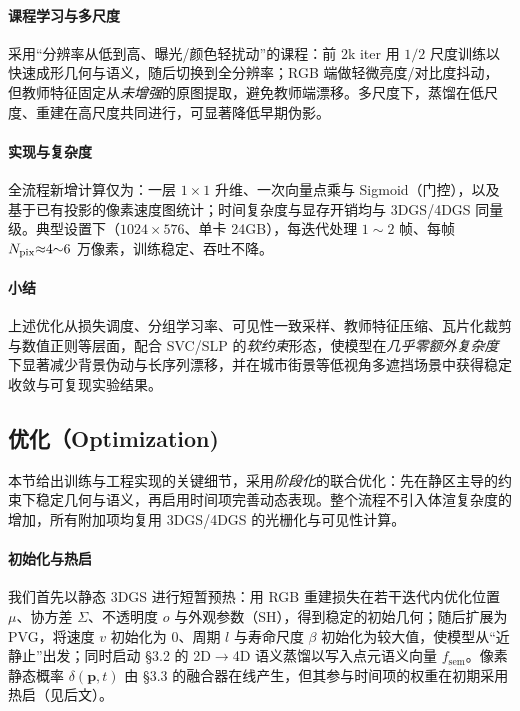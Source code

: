 \documentclass[10pt,conference]{IEEEtran} %
\begin{document}
\paragraph{课程学习与多尺度}
采用“分辨率从低到高、曝光/颜色轻扰动”的课程：前 $2$k iter 用 $1/2$ 尺度训练以快速成形几何与语义，随后切换到全分辨率；RGB 端做轻微亮度/对比度抖动，但教师特征固定从\emph{未增强}的原图提取，避免教师端漂移。多尺度下，蒸馏在低尺度、重建在高尺度共同进行，可显著降低早期伪影。

\paragraph{实现与复杂度}
全流程新增计算仅为：一层 $1{\times}1$ 升维、一次向量点乘与 Sigmoid（门控），以及基于已有投影的像素速度图统计；时间复杂度与显存开销均与 3DGS/4DGS 同量级。典型设置下（$1024{\times}576$、单卡 24GB），每迭代处理 $1{\sim}2$ 帧、每帧 $N_{\rm pix}{\approx}4{\sim}6$ 万像素，训练稳定、吞吐不降。

\paragraph{小结}
上述优化从损失调度、分组学习率、可见性一致采样、教师特征压缩、瓦片化裁剪与数值正则等层面，配合 SVC/SLP 的\emph{软约束}形态，使模型在\emph{几乎零额外复杂度}下显著减少背景伪动与长序列漂移，并在城市街景等低视角多遮挡场景中获得稳定收敛与可复现实验结果。

\subsection{优化（Optimization)}
本节给出训练与工程实现的关键细节，采用\emph{阶段化}的联合优化：先在静区主导的约束下稳定几何与语义，再启用时间项完善动态表现。整个流程不引入体渲复杂度的增加，所有附加项均复用 3DGS/4DGS 的光栅化与可见性计算。

\paragraph{初始化与热启}
我们首先以静态 3DGS 进行短暂预热：用 RGB 重建损失在若干迭代内优化位置 $\mu$、协方差 $\Sigma$、不透明度 $o$ 与外观参数（SH），得到稳定的初始几何；随后扩展为 PVG，将速度 $v$ 初始化为 $0$、周期 $l$ 与寿命尺度 $\beta$ 初始化为较大值，使模型从“近静止”出发；同时启动 §3.2 的 2D$\rightarrow$4D 语义蒸馏以写入点元语义向量 $f_{\mathrm{sem}}$。像素静态概率 $\delta(\mathbf p,t)$ 由 §3.3 的融合器在线产生，但其参与时间项的权重在初期采用热启（见后文）。
\end{document}
